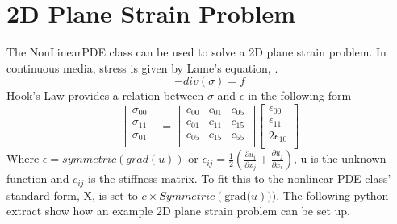 \section{2D Plane Strain Problem}
The NonLinearPDE class can be used to solve a 2D plane strain problem. In continuous media, stress is given by Lame's equation, .
\begin{equation} 
-div(\sigma)=f
\label{symbolic eq2}
\end{equation} 
Hook's Law provides a relation between $\sigma$ and $\epsilon$ in the following form
\begin{equation}
\left[ \begin{array}{c}
\sigma_{00} \\
\sigma_{11} \\
\sigma_{01} \\
\end{array} \right] = 
\left[ \begin{array}{ccc}
c_{00} & c_{01} & c_{05}\\
c_{01} & c_{11} & c_{15}\\
c_{05} & c_{15} & c_{55}\\
\end{array}\right]
\left[ \begin{array}{c}
\epsilon_{00} \\
\epsilon_{11} \\
2\epsilon_{10} \\
\end{array} \right]
\label{symbolic eq3}
\end{equation}
Where $\epsilon = symmetric(grad(u)) \text{ or } \epsilon_{ij}=\frac{1}{2}\left(\frac{\partial u_i}{\partial x_j} + {\frac{\partial u_j}{\partial x_i}}\right)$, u is the unknown function and $c_{ij}$ is the stiffness matrix. To fit this to the nonlinear PDE class' standard form, X, is set to $c \times Symmetric(\text{grad(}u)))$.
The following python extract show how an example 2D plane strain problem can be set up. 


